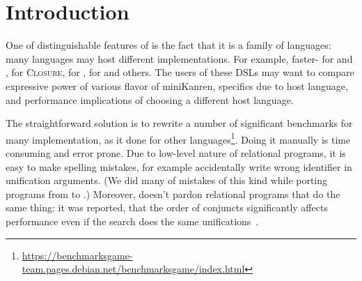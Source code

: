 

\section{Introduction}
\label{sec:intro}


One of distinguishable features of \miniKanren{} is the fact that it is a family of languages:
many languages may host different \miniKanren{} implementations.
For example, faster-\miniKanren{} for \Scheme{} and \Racket{}, \CoreLogic{} for \textsc{Closure}, \OCanren{} for \OCaml{}, \Klogic{} for \Kotlin{} and others.
The users of these DSLs may want to compare expressive power of various flavor of miniKanren, specifics due to host language, and performance implications of choosing a different host language.


The straightforward solution is to rewrite a number of significant benchmarks for many implementation, as it done for other languages\footnote{\url{https://benchmarksgame-team.pages.debian.net/benchmarksgame/index.html}}.
Doing it manually is time consuming and error prone.
Due to low-level nature of relational programs, it is easy to make spelling mistakes, for example accidentally write wrong identifier in unification arguments.
(We did many of mistakes of this kind while porting programs from \OCanren{} to \Klogic{}.) Moreover, \miniKanren{} doesn't pardon relational programs that do the same thing: it was reported, that the order of conjuncts significantly affects performance even if the search does the same unifications~\cite{scheduling2022}.
